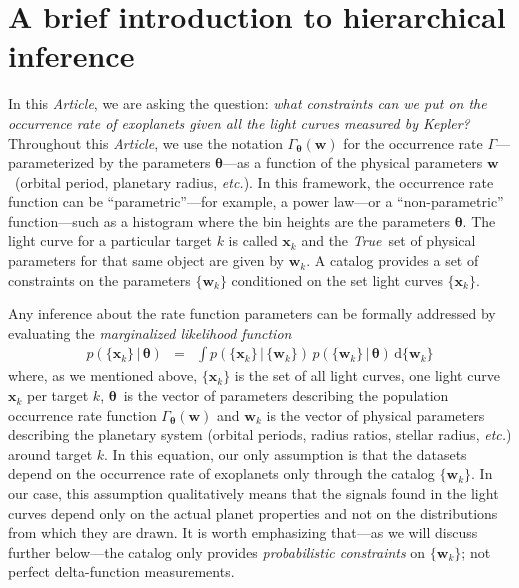 \documentclass[12pt,preprint]{aastex}
\newcommand{\project}[1]{{\sffamily #1}}
\newcommand{\kepler}{\project{Kepler}}
\newcommand{\paper}{\textsl{Article}}
\newcommand{\foreign}[1]{\emph{#1}}
\newcommand{\etc}{\foreign{etc.}}
\newcommand{\True}{\foreign{True}}
\newcommand{\eqlabel}[1]{\label{eq:#1}}
\newcommand{\dd}{\ensuremath{\,\mathrm{d}}}
\newcommand{\bvec}[1]{\ensuremath{\boldsymbol{#1}}}
\newcommand{\rate}{\ensuremath{\Gamma}}
\newcommand{\ratepar}{{\ensuremath{\theta}}}
\newcommand{\ratepars}{{\ensuremath{\bvec{\ratepar}}}}
\newcommand{\data}{{\ensuremath{\bvec{x}}}}
\newcommand{\entry}{{\ensuremath{\bvec{w}}}}
\begin{document}
\section{A brief introduction to hierarchical inference}

In this \paper, we are asking the question: \emph{what constraints can we put
on the occurrence rate of exoplanets given all the light curves measured by
\kepler?}
Throughout this \paper, we use the notation $\rate_\ratepars(\entry)$ for the
occurrence rate \rate---parameterized by the parameters \ratepars---as a
function of the physical parameters \entry\ (orbital period, planetary radius,
\etc).
In this framework, the occurrence rate function can be ``parametric''---for
example, a power law---or a ``non-parametric'' function---such as a histogram
where the bin heights are the parameters \ratepars.
The light curve for a particular target $k$ is called $\data_k$ and the
\True\ set of physical parameters for that same object are given by
$\entry_k$.
A catalog provides a set of constraints on the parameters $\{\entry_k\}$
conditioned on the set light curves $\{\data_k\}$.

Any inference about the rate function parameters can be formally addressed by
evaluating the \emph{marginalized likelihood function}
\begin{eqnarray}\eqlabel{crazylike}
p(\{\data_k\}\,|\,\ratepars) &=&
    \int p(\{\data_k\}\,|\,\{\entry_k\})
    \,p(\{\entry_k\}\,|\,\ratepars)
    \dd\{\entry_k\}
\end{eqnarray}
where, as we mentioned above, $\{\data_k\}$ is the set of all light curves,
one light curve $\data_k$ per target $k$, \ratepars\ is the vector of
parameters describing the population occurrence rate function
$\rate_\ratepars(\entry)$ and $\entry_k$ is the vector of physical parameters
describing the planetary system (orbital periods, radius ratios, stellar
radius, \etc) around target $k$.
In this equation, our only assumption is that the datasets depend on the
occurrence rate of exoplanets only through the catalog $\{\entry_k\}$.
In our case, this assumption qualitatively means that the signals found in the
light curves depend only on the actual planet properties and not on the
distributions from which they are drawn.
It is worth emphasizing that---as we will discuss further below---the catalog
only provides \emph{probabilistic constraints} on $\{\entry_k\}$; not perfect
delta-function measurements.
\end{document}
